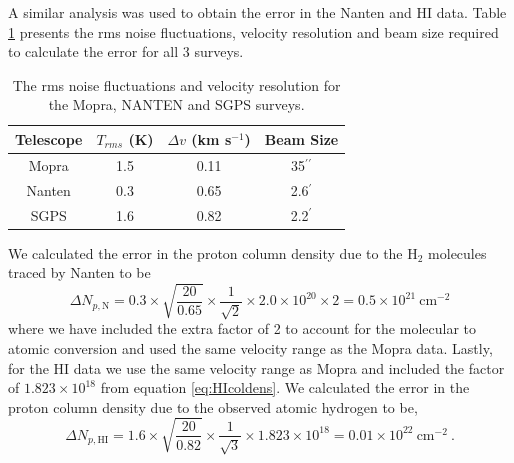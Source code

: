 \documentclass[12pt,a4paper]{article}
\begin{document}
A similar analysis was used to obtain the error in the Nanten and HI data. Table \ref{tab:erroranal} presents the rms noise fluctuations, velocity resolution and beam size required to calculate the error for all 3 surveys. 
\begin{table}[H] 
	\centering
	\begin{tabular}{c|ccc}
		\toprule
		Telescope & $T_{rms}$ (K) & $\Delta v$ (km s$^{-1}$) & Beam Size \\
		\hline 
		Mopra & 1.5 & 0.11 & 35$^{\prime \prime}$ \\
		Nanten & 0.3 & 0.65 & 2.6$^\prime$\\
		SGPS & 1.6 & 0.82 & 2.2$^\prime$\\
		\bottomrule
	\end{tabular} 
	\caption{The rms noise fluctuations and velocity resolution for the Mopra, NANTEN and SGPS surveys.}
	\label{tab:erroranal}
\end{table}
We calculated the error in the proton column density due to the H$_2$ molecules traced by Nanten to be
\begin{equation}
\Delta N_{p,\mathrm{N}} = 0.3 \times \sqrt{\dfrac{20}{0.65}} \times \dfrac{1}{\sqrt{2}} \times 2.0 \times 10^{20} \times 2 = 0.5 \times 10^{21} \ \mathrm{cm}^{-2}
\end{equation}
where we have included the extra factor of 2 to account for the molecular to atomic conversion and used the same velocity range as the Mopra data. Lastly, for the HI data we use the same velocity range as Mopra and included the factor of $1.823 \times 10^{18}$ from equation \ref{eq:HIcoldens}. We calculated the error in the proton column density due to the observed atomic hydrogen to be,
\begin{equation}
\Delta N_{p,\mathrm{HI}} =  1.6 \times \sqrt{\dfrac{20}{0.82}} \times \dfrac{1}{\sqrt{3}} \times  1.823 \times 10^{18} = 0.01 \times 10^{22} \ \mathrm{cm}^{-2} \ .
\end{equation} 
\end{document}
